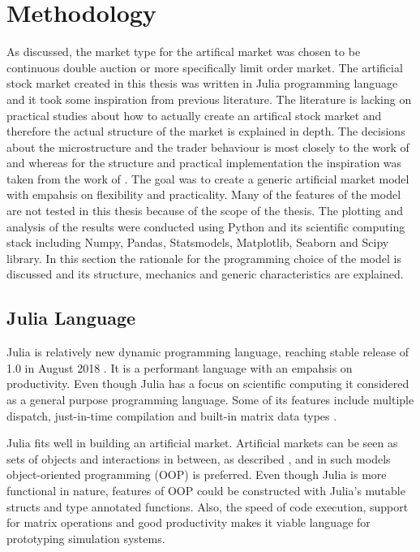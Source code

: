 
\section{Methodology}

As discussed, the market type for the artifical market was chosen 
to be continuous double auction or more specifically limit order market.
The artificial stock market created in this thesis was written in Julia
programming language and it took some inspiration from previous literature.
The literature is lacking on practical studies about how to actually create
an artifical stock market and therefore the actual structure of the market is explained
in depth. The decisions about the microstructure and the trader behaviour
is most closely to the work of \citet{Genoa01} and \citet{Raberto05}
whereas for the structure and practical implementation the inspiration
was taken from the work of \citet{Ben12}. The goal was to create a generic artificial market 
model with empahsis on flexibility and practicality. Many of the features
of the model are not tested in this thesis because of the scope of the thesis.
The plotting and analysis of the results were conducted using Python and its scientific
computing stack including Numpy, Pandas, Statsmodels, Matplotlib, Seaborn and Scipy library.
In this section the rationale for the programming choice of the model is discussed
and its structure, mechanics and generic characteristics are 
explained.


\subsection{Julia Language}
Julia is relatively new dynamic programming language, 
reaching stable release of 1.0 in August 2018 \citep{JuliaV1}.
It is a performant language with an empahsis
on productivity. Even though Julia has a focus on scientific 
computing it considered as a general purpose programming
language. Some of its features include
multiple dispatch, just-in-time compilation and built-in
matrix data types \citep{Julia}.

Julia fits well in building an artificial market.
Artificial markets can be seen as sets of objects
and interactions in between, as described \citet{Ben12},
and in such models object-oriented programming (OOP)
is preferred. Even though Julia is more functional in nature, 
features of OOP could be constructed with Julia's mutable structs 
and type annotated functions. Also, the speed of code execution, 
support for matrix operations and good productivity makes 
it viable language for prototyping simulation systems. 


